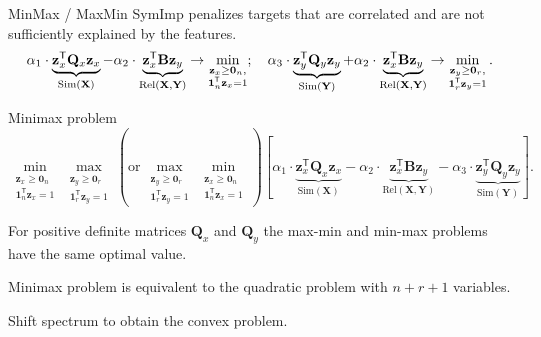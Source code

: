 \documentclass[9pt]{beamer}
\newcommand{\bz}{\mathbf{z}}
\newcommand{\bY}{\mathbf{Y}}
\newcommand{\bX}{\mathbf{X}}
\newcommand{\bB}{\mathbf{B}}
\newcommand{\bQ}{\mathbf{Q}}
\newcommand{\bOne}{\boldsymbol{1}}
\newcommand{\bZero}{\boldsymbol{0}}
\newcommand{\T}{\mathsf{T}}
\begin{document}
\begin{frame}{MinMax / MaxMin}
	SymImp penalizes targets that are correlated and are not sufficiently explained by the features. 
	\[
	\alpha_1 \cdot \underbrace{\bz_x^{\T} \bQ_x \bz_x}_{\text{Sim}(\bX)} - \alpha_2 \cdot \underbrace{\vphantom{()} \bz_x^{\T}\mathbf{B} \bz_y}_{\text{Rel}(\bX, \bY)} \rightarrow \min_{\substack{\bz_x \geq \bZero_n, \\ \bOne_n^{\T}\bz_x=1}}; \quad
	\alpha_3 \cdot \underbrace{\bz_y^{\T} \bQ_y \bz_y}_{\text{Sim}(\bY)} + \alpha_2 \cdot \underbrace{\vphantom{()} \bz_x^{\T} \mathbf{B} \bz_y}_{\text{Rel}(\bX, \bY)} \rightarrow \min_{\substack{\bz_y \geq \bZero_r,  \\ \bOne_r^{\T}\bz_y=1}}.
	\]
	\vspace{-0.2cm}
	\begin{block}{Minimax problem}
	\vspace{-0.5cm}
	\[
	\min_{\substack{\bz_x \geq \bZero_n \\ \bOne_n^{\T}\bz_x=1}} 	\max_{\substack{\bz_y \geq \bZero_r \\ \bOne_r^{\T}\bz_y=1}} \left(\text {or} \, \max_{\substack{\bz_y \geq \bZero_r \\ \bOne_r^{\T}\bz_y=1}} \min_{\substack{\bz_x \geq \bZero_n \\ \bOne_n^{\T}\bz_x=1}}\right) \left[\alpha_1 \cdot \underbrace{\bz_x^{\T} \bQ_x \bz_x}_{\text{Sim}(\bX)} - \alpha_2 \cdot \underbrace{\bz_x^{\T} \bB \bz_y}_{\text{Rel}(\bX, \bY)} - \alpha_3 \cdot \underbrace{\bz_y^{\T} \bQ_y \bz_y}_{\text{Sim}(\bY)}\right].
	\]
	\end{block}
	\vspace{-0.4cm}
	\begin{theorem}
		For positive definite matrices $\bQ_x$ and $\bQ_y$ the max-min and min-max problems have the same optimal value. 
	\end{theorem}
	\vspace{-0.2cm}
	\begin{theorem}
		Minimax problem is equivalent to the quadratic problem with $n + r + 1$ variables.
	\end{theorem}
	Shift spectrum to obtain the convex problem.

\end{frame}
\end{document}

